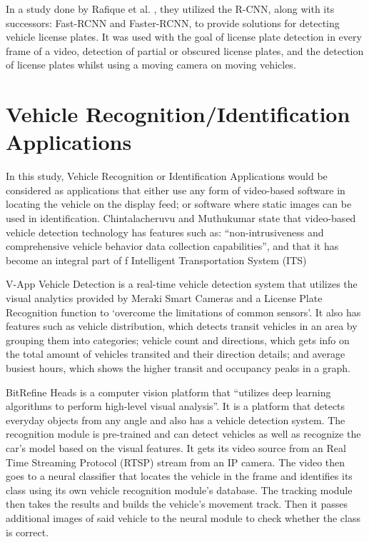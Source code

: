 In a study done by Rafique et al. \citeyear{Rafique_Pedrycz_Jeon_2017}, they utilized the R-CNN, along with its successors: Fast-RCNN and Faster-RCNN, to provide solutions for detecting vehicle license plates. It was used with the goal of license plate detection in every frame of a video, detection of partial or obscured license plates, and the detection of license plates whilst using a moving camera on moving vehicles.



\section{Vehicle Recognition/Identification Applications}
	
	In this study, Vehicle Recognition or Identification Applications would be considered as applications that either use any form of video-based software in locating the vehicle on the display feed; or software where static images can be used in identification. Chintalacheruvu and Muthukumar \citeyear{chintalacheruvu_2012} state that video-based vehicle detection technology has features such as: “non-intrusiveness and comprehensive vehicle behavior data collection capabilities”, and that it has become an integral part of f Intelligent Transportation System (ITS)

	V-App Vehicle Detection is a real-time vehicle detection system that utilizes the visual analytics provided by Meraki Smart Cameras and a License Plate Recognition function to ‘overcome the limitations of common sensors’. It also has features such as vehicle distribution, which detects transit vehicles in an area by grouping them into categories; vehicle count and directions, which gets info on the total amount of vehicles transited and their direction details; and average busiest hours, which shows the higher transit and occupancy peaks in a graph. \cite{VAPP_ND}

	BitRefine Heads is a computer vision platform that “utilizes deep learning algorithms to perform high-level visual analysis”. It is a platform that detects everyday objects from any angle and also has a vehicle detection system. The recognition module is pre-trained and can detect vehicles as well as recognize the car’s model based on the visual features. It gets its video source from an Real Time Streaming Protocol (RTSP) stream from an IP camera. The video then goes to a neural classifier that locates the vehicle in the frame and identifies its class using its own vehicle recognition module’s database.  The tracking module then takes the results and builds the vehicle’s movement track. Then it passes additional images of said vehicle to the neural module to check whether the class is correct. \cite{BITREFINE_ND}


